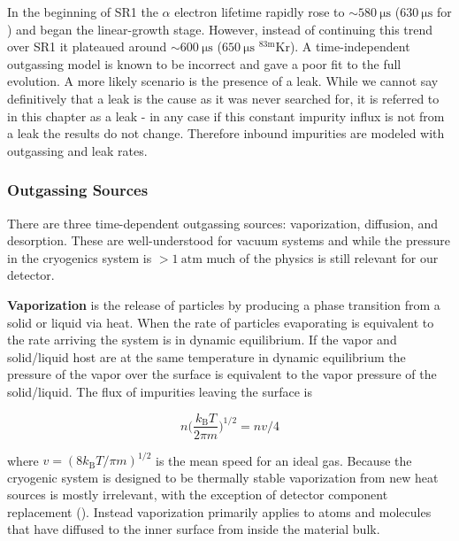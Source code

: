 In the beginning of SR1 the $\alpha$ electron lifetime rapidly rose to ${\sim} 580\ \mathrm{\mu s}$ ($630\ \mathrm{\mu s}$ for \metakr)
and began the linear-growth stage.  However, instead of continuing this trend over SR1
it plateaued around ${\sim} 600\ \mathrm{\mu s}$ ($650\ \mathrm{\mu s}$ $\mathrm{^{83m}Kr}$).  A time-independent outgassing model is
known to be incorrect and
gave a poor fit to the full evolution.  A more likely scenario is the presence of a leak.  While we cannot say definitively that a leak
is the cause as it was never searched for, it is referred to in this chapter as a leak - in any case
if this constant impurity influx is not from a leak the results do not change.  Therefore inbound impurities are modeled with
outgassing and leak rates.



\subsubsection{Outgassing Sources}
\label{subsubsec:electron_lifetime_model_outgassing_sources}
There are three time-dependent outgassing sources: vaporization, diffusion, and desorption.  These are well-understood for vacuum systems
and while the pressure in the cryogenics system is $> 1\ \mathrm{atm}$ much of the physics is still relevant for our detector.

\textbf{Vaporization} is the release of particles by producing a phase transition from a solid or liquid via heat.  When the rate of
particles evaporating is equivalent to the rate arriving the system is in dynamic equilibrium.  If the vapor and solid/liquid host are at
the same temperature in dynamic equilibrium the pressure of the vapor over the surface is equivalent to the vapor pressure of the
solid/liquid.  The flux of impurities leaving the surface is

\begin{equation}
n \bigg( \frac{k_{\mathrm{B}}T}{2 \pi m} \bigg)^{1/2} = nv/4
\end{equation}

\noindent where $v = (8k_{\mathrm{B}}T/\pi m)^{1/2}$ is the mean speed for an ideal gas.  Because the cryogenic system is designed to be
thermally
stable vaporization from new heat sources is mostly irrelevant, with the exception of detector component replacement
().  Instead vaporization primarily applies to atoms and molecules that have diffused to the
inner surface from inside the material bulk.


